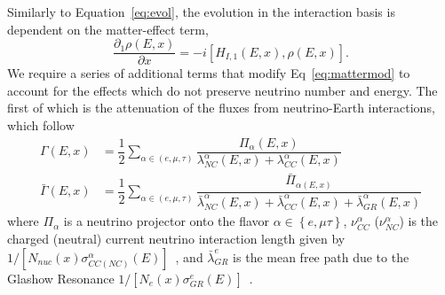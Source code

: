\documentclass[main.tex]{subfiles}
\begin{document}
Similarly to Equation~\eqref{eq:evol}, the evolution in the interaction basis is dependent on the matter-effect term,
\begin{equation}\label{eq:mattermod}
    \dfrac{\partial_{1}\rho (E,x)}{\partial x} = -i\left[ H_{I,1}(E,x), \rho(E,x)\right].
\end{equation}
We require a series of additional terms that modify Eq~\eqref{eq:mattermod} to account for the effects which do not preserve neutrino number and energy. 
The first of which is the attenuation of the fluxes from neutrino-Earth interactions, which follow 
\begin{align}\label{eq:nu_evol}
    \Gamma(E,x) &= \dfrac{1}{2}\sum\limits_{\alpha\in(e,\mu,\tau)} \dfrac{\Pi_{\alpha}(E,x) }{\lambda_{NC}^{\alpha}(E,x) + \lambda_{CC}^{\alpha} (E,x)} \\
    \bar{\Gamma}(E,x) &= \dfrac{1}{2}\sum_{\alpha\in(e,\mu,\tau)} \dfrac{\bar{\Pi}_{\alpha(E,x)}}{\bar{\lambda}_{NC}^{\alpha}(E,x) + \bar{\lambda}_{CC}^{\alpha}(E,x) + \bar{\lambda}_{GR}^{\alpha}(E,x) }\label{eq:nubar_evol}
\end{align}
where $\Pi_{\alpha}$ is a neutrino projector onto the flavor $\alpha\in\left\lbrace e,\mu\tau\right\rbrace$, $\nu_{CC}^{\alpha}$ ($\nu_{NC}^{\alpha}$) is the charged (neutral) current neutrino interaction length given by $1/\left[ N_{nuc}(x)\sigma^{\alpha}_{CC(NC)}(E) \right]$~\cite{Formaggio:2013kya, Gandhi:1995tf, Beacom:2019pzs, Zhou:2019vxt, Cooper_Sarkar_2011}, and $\bar{\lambda}_{GR}^{e}$ is the mean free path due to the Glashow Resonance $1/\left[ N_{e}(x)\sigma^{e}_{GR}(E) \right]$~\cite{PhysRev.118.316}. 
\end{document}
